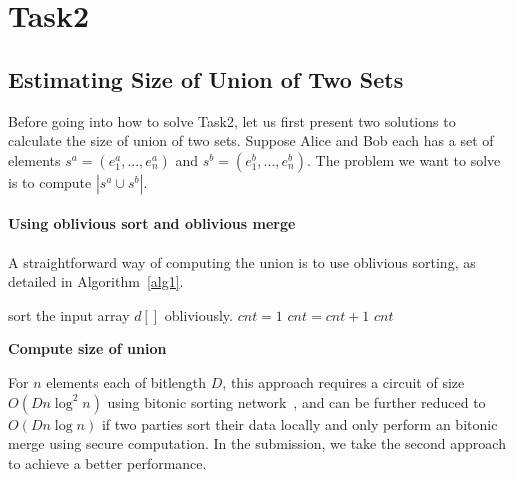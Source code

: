 \section{Task2}
\subsection{Estimating Size of Union of Two Sets}
Before going into how to solve Task2, let us first present two solutions to calculate the size of union of two sets.
Suppose Alice and Bob each has a set of elements $s^a = (e^a_1,...,e^a_n)$
and $s^b = (e^b_1,...,e^b_n)$. The problem we want to solve is 
to compute $|s^a\cup s^b|$.

\paragraph{Using oblivious sort and oblivious merge}
A straightforward way of computing the union is to use oblivious sorting, as detailed in Algorithm~\ref{alg1}.

\begin{algorithm}
\begin{algorithmic}[1]
\State sort the input array $d[]$ obliviously.
\State $cnt = 1$
		\State $cnt = cnt + 1$
	\EndIf
\EndFor
\State\Return $cnt$
\end{algorithmic}
\caption{\textbf{Compute size of union}} %
\label{alg1}
\end{algorithm}
For $n$ elements each of bitlength $D$, this approach requires a circuit of size $O(Dn\log^2n)$ using bitonic sorting network~\cite{bitonicsort},
and can be further reduced to $O(Dn\log n)$ if two parties sort their data locally and only perform an bitonic merge using secure computation.
In the submission, we take the second approach to achieve a better performance.

